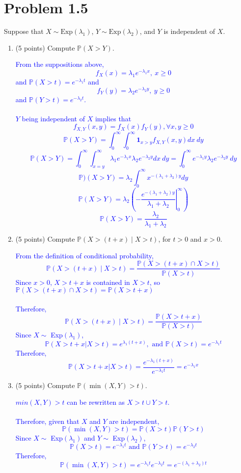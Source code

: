 \documentclass{article}
\begin{document}
\section*{Problem 1.5}
Suppose that $X \sim \text{Exp}(\lambda_1)$, $Y \sim \text{Exp}(\lambda_2)$, and $Y$ is independent of $X$.

\begin{enumerate}[label=(\alph*)]
    \item (5 points) Compute $\mathbb{P}(X > Y)$.

        \textcolor{blue}{From the suppositions above, $$f_X(x)=\lambda_1e^{-\lambda_1x},\ x \geq 0$$ and $\mathbb{P}(X>t)=e^{-\lambda_1t}$ and 
        $$f_Y(y)=\lambda_2e^{-\lambda_2y},\ y \geq 0$$ and $\mathbb{P}(Y>t)=e^{-\lambda_2t}$. \\ \\ 
        $Y$ being independent of $X$ implies that $$f_{X,Y}(x,y)=f_X(x)f_Y(y), \forall x,y \geq 0$$
    $$\mathbb{P}(X>Y)=\int_{0}^{\infty}\int_{0}^{\infty}\mathbf{1}_{x>y}f_{X,Y}(x,y)dx\ dy$$
    $$\mathbb{P}(X>Y)=\int_{0}^{\infty}\int_{x=y}^{\infty}\lambda_1e^{-\lambda_1x}\lambda_2 e^{-\lambda_2 y} dx\ dy= \int_{0}^{\infty}e^{-\lambda_1y}\lambda_2 e^{-\lambda_2 y}\ dy$$
$$\mathbb{P})(X>Y)=\lambda_2 \int_0^{\infty}x^{-(\lambda_1 + \lambda_2)y}dy$$
$$\mathbb{P}(X>Y)=\lambda_2 \left( - \left. \frac{e^{-(\lambda_1 + \lambda_2)y}}{\lambda_1 + \lambda_2}\right|_{0}^{\infty} \right) $$
$$\mathbb{P}(X>Y)=\frac{\lambda_2}{\lambda_1 + \lambda_2}$$}

    \item (5 points) Compute $\mathbb{P}(X > (t + x) \mid X > t)$, for $t > 0$ and $x > 0$.

    \textcolor{blue}{From the definition of conditional probability, $$\mathbb{P}(X > (t + x) \mid X > t)=\frac{\mathbb{P}(X > (t + x) \cap X > t)}{\mathbb{P}(X > t)}$$
        Since $x>0$, ${X>t+x}$ is contained in ${X>t}$, so $\mathbb{P}(X > (t + x) \cap X > t)=\mathbb{P}(X > t + x)$ \\ \\ 
    Therefore, $$\mathbb{P}(X > (t + x) \mid X > t)=\frac{\mathbb{P}(X > t + x)}{\mathbb{P}(X > t)}$$
Since $X \sim $ Exp$(\lambda_1)$, $$\mathbb{P}(X>t+x|X>t)=e^{\lambda_1(t+x)},\text{ and }  \mathbb{P}(X>t)=e^{-\lambda_1t}$$
Therefore, $$\mathbb{P}(X>t+x|X>t)=\frac{e^{-\lambda_1(t+x)}}{e^{-\lambda_1t}}=e^{-\lambda_1x}$$}

    \item (5 points) Compute $\mathbb{P}(\min(X, Y) > t)$.

        \textcolor{blue}{${min(X,Y)>t}$ can be rewritten as ${X>t \cup Y>t}$. \\ \\ Therefore, given that $X$ and $Y$ are independent, $$\mathbb{P}(\min(X,Y)>t)=\mathbb{P}(X>t)\mathbb{P}(Y>t)$$
            Since $X \sim$ Exp$(\lambda_1)$ and $Y \sim$ Exp$(\lambda_2)$, $$\mathbb{P}(X>t)=e^{-\lambda_1t} \text{ and } \mathbb{P}(Y>t)=e^{-\lambda_2t}$$
        Therefore, $$\mathbb{P}(\min(X,Y)>t)=e^{-\lambda_1t}e^{-\lambda_2t}=e^{-(\lambda_1+\lambda_2)t}$$}

\end{enumerate}
\end{document}
